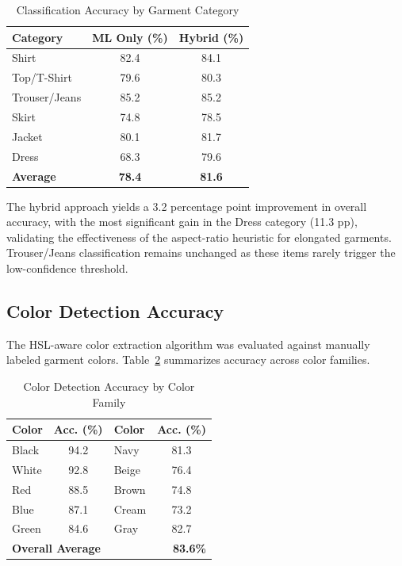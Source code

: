 \documentclass[conference]{IEEEtran}
\begin{document}
\begin{table}[htbp]
\caption{Classification Accuracy by Garment Category}
\begin{center}
\begin{tabular}{lcc}
\toprule
\textbf{Category} & \textbf{ML Only (\%)} & \textbf{Hybrid (\%)} \\
\midrule
Shirt & 82.4 & 84.1 \\
Top/T-Shirt & 79.6 & 80.3 \\
Trouser/Jeans & 85.2 & 85.2 \\
Skirt & 74.8 & 78.5 \\
Jacket & 80.1 & 81.7 \\
Dress & 68.3 & 79.6 \\
\midrule
\textbf{Average} & \textbf{78.4} & \textbf{81.6} \\
\bottomrule
\end{tabular}
\end{center}
\label{tab:classification}
\end{table}

The hybrid approach yields a 3.2 percentage point improvement in overall accuracy, with the most significant gain in the Dress category (11.3 pp), validating the effectiveness of the aspect-ratio heuristic for elongated garments. Trouser/Jeans classification remains unchanged as these items rarely trigger the low-confidence threshold.

\subsection{Color Detection Accuracy}

The HSL-aware color extraction algorithm was evaluated against manually labeled garment colors. Table~\ref{tab:color} summarizes accuracy across color families.

\begin{table}[htbp]
\caption{Color Detection Accuracy by Color Family}
\begin{center}
\begin{tabular}{lc|lc}
\toprule
\textbf{Color} & \textbf{Acc. (\%)} & \textbf{Color} & \textbf{Acc. (\%)} \\
\midrule
Black & 94.2 & Navy & 81.3 \\
White & 92.8 & Beige & 76.4 \\
Red & 88.5 & Brown & 74.8 \\
Blue & 87.1 & Cream & 73.2 \\
Green & 84.6 & Gray & 82.7 \\
\midrule
\multicolumn{2}{l}{\textbf{Overall Average}} & \multicolumn{2}{r}{\textbf{83.6\%}} \\
\bottomrule
\end{tabular}
\end{center}
\label{tab:color}
\end{table}
\end{document}

